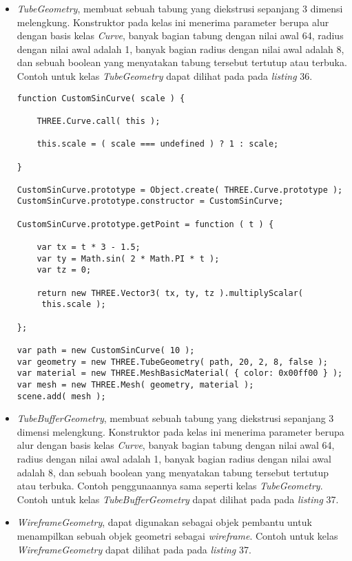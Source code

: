 \documentclass[a4paper,twoside]{article}
\begin{document}
\begin{enumerate}
\begin{itemize}
\begin{itemize}
	\item {\it TubeGeometry}, membuat sebuah tabung yang diekstrusi sepanjang 3 dimensi melengkung. Konstruktor pada kelas ini menerima parameter berupa alur dengan basis kelas {\it Curve}, banyak bagian tabung dengan nilai awal 64, radius dengan nilai awal adalah 1, banyak bagian radius dengan nilai awal adalah 8, dan sebuah boolean yang menyatakan tabung tersebut tertutup atau terbuka. Contoh untuk kelas {\it TubeGeometry} dapat dilihat pada pada {\it listing} 36.
	
\begin{lstlisting}[caption={Contoh penggunaan kelas {\it TubeGeometry}.},captionpos=b]
function CustomSinCurve( scale ) {

	THREE.Curve.call( this );

	this.scale = ( scale === undefined ) ? 1 : scale;

}

CustomSinCurve.prototype = Object.create( THREE.Curve.prototype );
CustomSinCurve.prototype.constructor = CustomSinCurve;

CustomSinCurve.prototype.getPoint = function ( t ) {

	var tx = t * 3 - 1.5;
	var ty = Math.sin( 2 * Math.PI * t );
	var tz = 0;

	return new THREE.Vector3( tx, ty, tz ).multiplyScalar(
	 this.scale );

};

var path = new CustomSinCurve( 10 );
var geometry = new THREE.TubeGeometry( path, 20, 2, 8, false );
var material = new THREE.MeshBasicMaterial( { color: 0x00ff00 } );
var mesh = new THREE.Mesh( geometry, material );
scene.add( mesh );
\end{lstlisting}

	\item {\it TubeBufferGeometry},  membuat sebuah tabung yang diekstrusi sepanjang 3 dimensi melengkung. Konstruktor pada kelas ini menerima parameter berupa alur dengan basis kelas {\it Curve}, banyak bagian tabung dengan nilai awal 64, radius dengan nilai awal adalah 1, banyak bagian radius dengan nilai awal adalah 8, dan sebuah boolean yang menyatakan tabung tersebut tertutup atau terbuka. Contoh penggunaannya sama seperti kelas {\it TubeGeometry}. Contoh untuk kelas {\it TubeBufferGeometry} dapat dilihat pada pada {\it listing} 37.
	
	\item {\it WireframeGeometry}, dapat digunakan sebagai objek pembantu untuk menampilkan sebuah objek geometri sebagai {\it wireframe}. Contoh untuk kelas {\it WireframeGeometry} dapat dilihat pada pada {\it listing} 37.
	

\end{itemize}
\end{itemize}
\end{enumerate}
\end{document}
